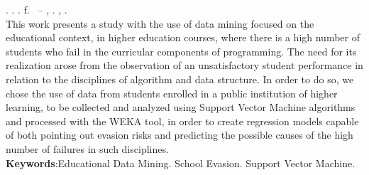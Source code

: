 % 
%


\begin{resumo}[ABSTRACT]
\begin{SingleSpacing}

\imprimirautorcitacao. \imprimirtitleabstract. \imprimirdata. \pageref {LastPage} f. \imprimirprojeto\ – \imprimirprograma, \imprimirinstituicao. \imprimirlocal, \imprimirdata.\\

This work presents a study with the use of data mining focused on the educational context, in higher education courses, where there is a high number of students who fail in the curricular components of programming. The need for its realization arose from the observation of an unsatisfactory student performance in relation to the disciplines of algorithm and data structure. In order to do so, we chose the use of data from students enrolled in a public institution of higher learning, to be collected and analyzed using Support Vector Machine algorithms and processed with the WEKA tool, in order to create regression models capable of both pointing out evasion risks and predicting the possible causes of the high number of failures in such disciplines.\\

\textbf{Keywords}:Educational Data Mining. School Evasion. Support Vector Machine.

\end{SingleSpacing}
\end{resumo}

